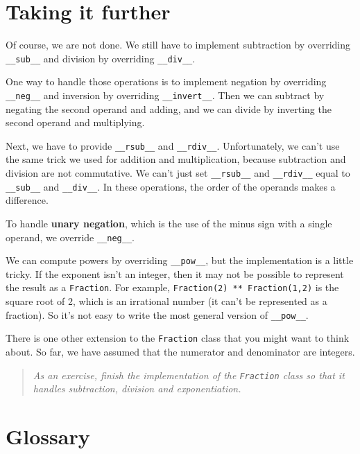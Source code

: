 \section {Taking it further}

Of course, we are not done.  We still have to implement
subtraction by overriding {\tt \_\_sub\_\_} and division
by overriding {\tt \_\_div\_\_}.

One way to handle those operations is to implement negation
by overriding
{\tt \_\_neg\_\_} and inversion by overriding {\tt \_\_invert\_\_}.
Then we can subtract by negating the second operand and adding,
and we can divide by inverting the second operand and
multiplying.

Next, we have to provide {\tt \_\_rsub\_\_} and {\tt \_\_rdiv\_\_}.
Unfortunately, we can't use the same trick we used for addition and
multiplication, because subtraction and division are not commutative.
We can't just set {\tt \_\_rsub\_\_} and {\tt \_\_rdiv\_\_} equal to
{\tt \_\_sub\_\_} and {\tt \_\_div\_\_}.  In these operations, the
order of the operands makes a difference.

To handle {\bf unary negation}, which is the use of the minus
sign with a single operand, we override {\tt \_\_neg\_\_}.


We can compute powers by overriding {\tt \_\_pow\_\_},
but the implementation is a little tricky.  If the exponent isn't
an integer, then it may not be possible to represent the result
as a {\tt Fraction}.  For example, {\tt Fraction(2) ** Fraction(1,2)}
is the square root of 2, which is an irrational number (it can't
be represented as a fraction).
So it's not easy to write the most general version of {\tt \_\_pow\_\_}.


There is one other extension to the {\tt Fraction} class that you might
want to think about.  So far, we have assumed that the numerator
and denominator are integers.

\begin{quote}
{\em As an exercise, finish the implementation of the {\tt Fraction}
class so that it handles subtraction, division and exponentiation.}
\end{quote}



\section{Glossary}

